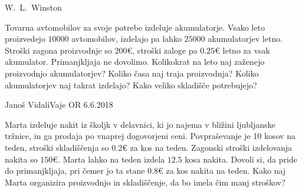 \begin{naloga}{W.~L.~Winston}{\cite[\S15, Example~5]{w}}
\begin{vprasanje}[akumulatorji]
Tovarna avtomobilov za svoje potrebe izdeluje akumulatorje.
Vsako leto proizvedejo $10000$ avtomobilov,
izdelajo pa lahko $25000$ akumulatorjev letno.
Stroški zagona proizvodnje so $200 €$,
stroški zaloge pa $0.25 €$ letno za vsak akumulator.
Primanjkljaja ne dovolimo.
Kolikokrat na leto naj zaženejo proizvodnjo akumulatorjev?
Koliko časa naj traja proizvodnja?
Koliko akumulatorjev naj takrat izdelajo?
Kako veliko skladišče potrebujejo?
\end{vprasanje}
\begin{odgovor}
\end{odgovor}
\end{naloga}


\begin{naloga}{Janoš Vidali}{Vaje OR 6.6.2018}
\begin{vprasanje}[marta]
Marta izdeluje nakit iz školjk v delavnici,
ki jo najema v bližini ljubljanske tržnice,
in ga prodaja po vnaprej dogovorjeni ceni.
Povpraševanje je 10 kosov na teden,
stroški skladiščenja so $0.2 €$ za kos na teden.
Zagonski stroški izdelovanja nakita so $150 €$.
Marta lahko na teden izdela $12.5$ kosa nakita.
Dovoli si, da pride do primanjkljaja,
pri čemer jo ta stane $0.8 €$ za kos nakita na teden.
Kako naj Marta organizira proizvodnjo in skladiščenje,
da bo imela čim manj stroškov?
\end{vprasanje}
\begin{odgovor}
\end{odgovor}
\end{naloga}


